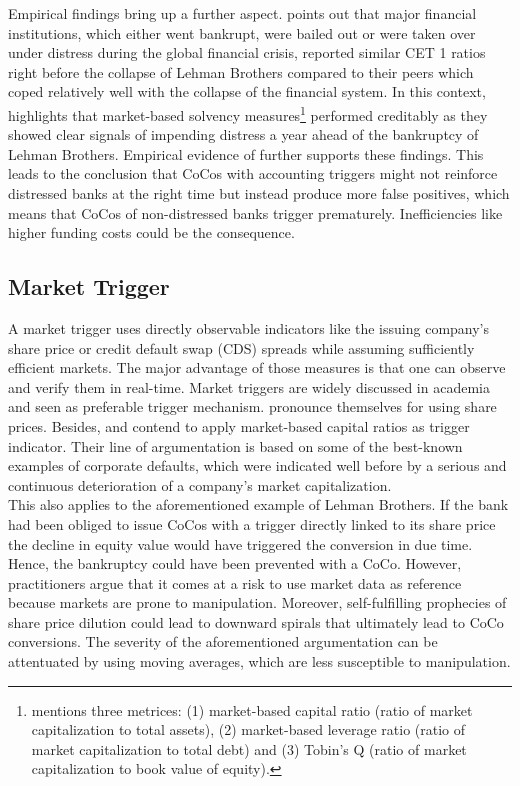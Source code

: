 Empirical findings bring up a further aspect. \citet{haldane2011capital} points out that major financial institutions, which either went bankrupt, were bailed out or were taken over under distress during the global financial crisis, reported similar CET 1 ratios right before the collapse of Lehman Brothers compared to their peers which coped relatively well with the collapse of the financial system. In this context, \citet{haldane2011capital} highlights that market-based solvency measures\footnote{\citet{haldane2011capital} mentions three metrices: (1) market-based capital ratio (ratio of market capitalization to total assets), (2) market-based leverage ratio (ratio of market capitalization to total debt) and (3) Tobin's Q (ratio of market capitalization to book value of equity).} performed creditably as they showed clear signals of impending distress a year ahead of the bankruptcy of Lehman Brothers. Empirical evidence of  further supports these findings. This leads to the conclusion that CoCos with accounting triggers might not reinforce distressed banks at the right time but instead produce more false positives, which means that CoCos of non-distressed banks trigger prematurely. Inefficiencies like higher funding costs could be the consequence. \citep{pazarbasioglu2011contingent}

\subsection{Market Trigger} \label{markettrigger}

A market trigger uses directly observable indicators like the issuing company's share price or credit default swap (CDS) spreads while assuming sufficiently efficient markets. The major advantage of those measures is that one can observe and verify them in real-time. \citep{haldane2011capital} Market triggers are widely discussed in academia and seen as preferable trigger mechanism. \citet{calomiris2013design} pronounce themselves for using share prices. Besides, \citet{haldane2011capital} and \citet{pazarbasioglu2011contingent} contend to apply market-based capital ratios as trigger indicator. Their line of argumentation is based on some of the best-known examples of corporate defaults, which were indicated well before by a serious and continuous deterioration of a company's market capitalization.\\ 

This also applies to the aforementioned example of Lehman Brothers. If the bank had been obliged to issue CoCos with a trigger directly linked to its share price the decline in equity value would have triggered the conversion in due time.\citep{calomiris2013design} Hence, the bankruptcy could have been prevented with a CoCo. However, practitioners argue that it comes at a risk to use market data as reference because markets are prone to manipulation. Moreover, self-fulfilling prophecies of share price dilution could lead to downward spirals that ultimately lead to CoCo conversions. \citep{pazarbasioglu2011contingent} The severity of the aforementioned argumentation can be attentuated by using moving averages, which are less susceptible to manipulation. 

